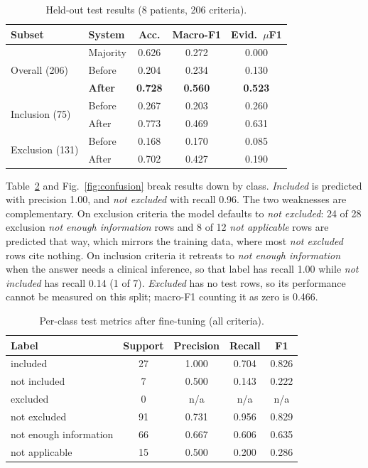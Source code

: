 \documentclass[conference]{IEEEtran}
\begin{document}
\begin{table}[t]
\centering
\caption{Held-out test results (8 patients, 206 criteria).}
\label{tab:test}
\setlength{\tabcolsep}{3.5pt}
\begin{tabular}{llccc}
\toprule
Subset & System & Acc. & Macro-F1 & Evid.\ $\mu$F1 \\
\midrule
\multirow{3}{*}{Overall (206)} & Majority & 0.626 & 0.272 & 0.000 \\
 & Before & 0.204 & 0.234 & 0.130 \\
 & \textbf{After} & \textbf{0.728} & \textbf{0.560} & \textbf{0.523} \\
\midrule
\multirow{2}{*}{Inclusion (75)} & Before & 0.267 & 0.203 & 0.260 \\
 & After & 0.773 & 0.469 & 0.631 \\
\midrule
\multirow{2}{*}{Exclusion (131)} & Before & 0.168 & 0.170 & 0.085 \\
 & After & 0.702 & 0.427 & 0.190 \\
\bottomrule
\end{tabular}
\end{table}

Table~\ref{tab:perclass} and Fig.~\ref{fig:confusion} break results down by class. \emph{Included} is predicted with precision 1.00, and \emph{not excluded} with recall 0.96. The two weaknesses are complementary. On exclusion criteria the model defaults to \emph{not excluded}: 24 of 28 exclusion \emph{not enough information} rows and 8 of 12 \emph{not applicable} rows are predicted that way, which mirrors the training data, where most \emph{not excluded} rows cite nothing. On inclusion criteria it retreats to \emph{not enough information} when the answer needs a clinical inference, so that label has recall 1.00 while \emph{not included} has recall 0.14 (1 of 7). \emph{Excluded} has no test rows, so its performance cannot be measured on this split; macro-F1 counting it as zero is 0.466.

\begin{table}[t]
\centering
\caption{Per-class test metrics after fine-tuning (all criteria).}
\label{tab:perclass}
\setlength{\tabcolsep}{4pt}
\begin{tabular}{lcccc}
\toprule
Label & Support & Precision & Recall & F1 \\
\midrule
included & 27 & 1.000 & 0.704 & 0.826 \\
not included & 7 & 0.500 & 0.143 & 0.222 \\
excluded & 0 & n/a & n/a & n/a \\
not excluded & 91 & 0.731 & 0.956 & 0.829 \\
not enough information & 66 & 0.667 & 0.606 & 0.635 \\
not applicable & 15 & 0.500 & 0.200 & 0.286 \\
\bottomrule
\end{tabular}
\end{table}
\end{document}
